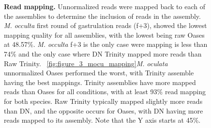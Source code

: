 \begin{figure}[!ht]
	\hfill
	\caption{\textbf{Read mapping.} Unnormalized reads were mapped back to each of the assemblies to determine the inclusion of reads in the assembly. \textit{M. occulta} first round of gastrulation reads (f+3), showed the lowest mapping quality for all assemblies, with the lowest being raw Oases at 48.57\%. \textit{M. occulta} f+3 is the only case were mapping is less than 74\% and the only case where DN Trinity mapped more reads than Raw Trinity. ~\ref{fig:figure_3_mocu_mapping}\textit{M. oculata} unnormalized Oases performed the worst, with Trinity assemble having the best mappings. Trinity assemblies have more mapped reads than Oases for all conditions, with at least 93\% read mapping for both species. Raw Trinity typically mapped slightly more reads than DN, and the opposite occurs for Oases, with DN having more reads mapped to its assembly.  Note that the Y axis starts at 45\%.}
	\label{fig:read_mapping}
\end{figure}

